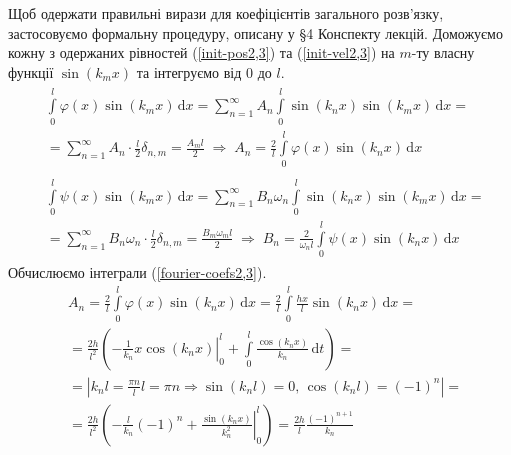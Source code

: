 Щоб одержати правильні вирази для коефіцієнтів загального розв'язку, застосовуємо формальну процедуру, описану у §4 Конспекту лекцій. Доможуємо кожну з одержаних рівностей (\ref{init-pos2,3}) та (\ref{init-vel2,3}) на $m$-ту власну функції $\sin(k_m x)$ та інтегруємо від $0$ до $l$. 
\begin{subequations} \label{fourier-coefs2,3}
    \begin{gather}
        \begin{aligned}
            &\int\limits_0^l \varphi(x) \sin(k_m x) \,\mathrm{d}x = \sum^{\infty}_{n=1} A_n \int\limits_0^l \sin(k_n x) \sin(k_m x) \,\mathrm{d}x =\\
            &= \sum^{\infty}_{n=1} A_n \cdot \frac{l}{2} \delta_{n,m} = \frac{A_m l}{2}
            \;\Rightarrow\;
            A_n = \frac{2}{l} \int\limits_0^l \varphi(x) \sin(k_n x) \,\mathrm{d}x 
        \end{aligned}\\
        \begin{aligned}
            &\int\limits_0^l \psi(x) \sin(k_m x) \,\mathrm{d}x = \sum^{\infty}_{n=1} B_n\omega_n \int\limits_0^l \sin(k_n x) \sin(k_m x) \,\mathrm{d}x =\\
            &= \sum^{\infty}_{n=1} B_n\omega_n \cdot \frac{l}{2} \delta_{n,m} = \frac{B_m \omega_m l}{2}
            \;\Rightarrow\;
            B_n = \frac{2}{\omega_n l} \int\limits_0^l \psi(x) \sin(k_n x) \,\mathrm{d}x
        \end{aligned}
    \end{gather}
\end{subequations} 
Обчислюємо інтеграли (\ref{fourier-coefs2,3}).
\begin{equation*}
    \begin{aligned}
        &A_n = \frac{2}{l} \int\limits_0^l \varphi(x) \sin(k_n x) \,\mathrm{d}x = \frac{2}{l} \int\limits_0^l \frac{hx}{l} \sin(k_n x) \,\mathrm{d}x =\\
        &= \frac{2h}{l^2} \left(\left.-\frac{1}{k_n} x \cos(k_n x)\right|_0^l + \int\limits_0^l \frac{\cos(k_n x)}{k_n} \,\mathrm{d}t\right) =\\
        &= \left| k_n l = \frac{\pi n}{l} l = \pi n \Rightarrow \sin(k_n l) = 0,\, \cos(k_n l) = (-1)^n \right| =\\
        &= \frac{2h}{l^2} \left(-\frac{l}{k_n}(-1)^n + \left.\frac{\sin(k_n x)}{k_n^2}\right|_0^l \right) = \frac{2h}{l} \frac{(-1)^{n+1}}{k_n}
    \end{aligned}
\end{equation*}
